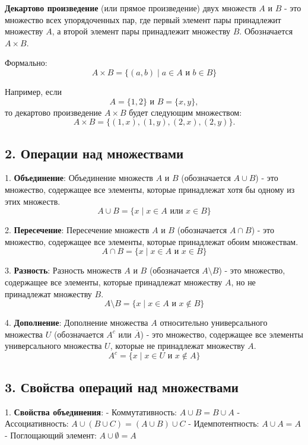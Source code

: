 \documentclass{article}
\begin{document}
\textbf{Декартово произведение} (или прямое произведение) двух множеств \( A \) и \( B \) - это множество всех упорядоченных пар, где первый элемент пары принадлежит множеству \( A \), а второй элемент пары принадлежит множеству \( B \). Обозначается \( A \times B \).

Формально:
\[
A \times B = \{ (a, b) \mid a \in A \text{ и } b \in B \}
\]

Например, если
\[
A = \{1, 2\} \text{ и } B = \{x, y\},
\]
то декартово произведение \( A \times B \) будет следующим множеством:
\[
A \times B = \{ (1, x), (1, y), (2, x), (2, y) \}.
\]

\subsection*{2. Операции над множествами}

1. \textbf{Объединение}: Объединение множеств \( A \) и \( B \) (обозначается \( A \cup B \)) - это множество, содержащее все элементы, которые принадлежат хотя бы одному из этих множеств.
   \[
   A \cup B = \{ x \mid x \in A \text{ или } x \in B \}
   \]

2. \textbf{Пересечение}: Пересечение множеств \( A \) и \( B \) (обозначается \( A \cap B \)) - это множество, содержащее все элементы, которые принадлежат обоим множествам.
   \[
   A \cap B = \{ x \mid x \in A \text{ и } x \in B \}
   \]

3. \textbf{Разность}: Разность множеств \( A \) и \( B \) (обозначается \( A \setminus B \)) - это множество, содержащее все элементы, которые принадлежат множеству \( A \), но не принадлежат множеству \( B \).	
   \[
   A \setminus B = \{ x \mid x \in A \text{ и } x \notin B \}
   \]

4. \textbf{Дополнение}: Дополнение множества \( A \) относительно универсального множества \( U \) (обозначается \( A^c \) или \( \overline{A} \)) - это множество, содержащее все элементы универсального множества \( U \), которые не принадлежат множеству \( A \).
   \[
   A^c = \{ x \mid x \in U \text{ и } x \notin A \}
   \]

\pagebreak
\subsection*{3. Свойства операций над множествами}

1. \textbf{Свойства объединения}: \hfill\break
   - Коммутативность: \( A \cup B = B \cup A \) \hfill\break
   - Ассоциативность: \( A \cup (B \cup C) = (A \cup B) \cup C \) \hfill\break
   - Идемпотентность: \( A \cup A = A \) \hfill\break
   - Поглощающий элемент: \( A \cup \emptyset = A \) \hfill\break
\end{document}
